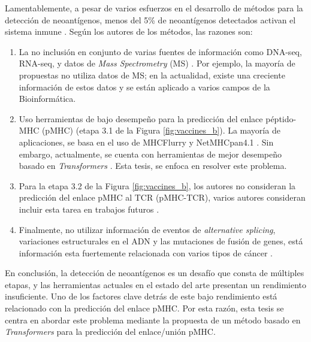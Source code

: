 Lamentablemente, a pesar de varios esfuerzos en el desarrollo  de métodos para la detección de neoantígenos, menos del 5\% de neoantígenos detectados activan el sistema inmune \citep{de2020neoantigen, mill2022neoms, bulik2019deep, bassani2015mass, yadav2014predicting}. Según los autores de los métodos,  las razones son: 

\begin{enumerate}
	\item La no inclusión en conjunto de varias fuentes de información como DNA-seq, RNA-seq, y datos de \textit{Mass Spectrometry} (MS) \citep{kim2018neopepsee}. Por ejemplo, la mayoría de  propuestas no utiliza datos de MS; en la actualidad, existe una creciente información de estos datos y se están aplicado a varios campos de la Bioinformática.
	\item  Uso herramientas de bajo desempeño para la predicción del enlace péptido-MHC (pMHC) (etapa 3.1  de la Figura \ref{fig:vaccines_b}). La mayoría de aplicaciones, se basa en el uso de MHCFlurry \citep{o2020mhcflurry} y NetMHCpan4.1 \citep{reynisson2020netmhcpan}. Sin embargo, actualmente, se cuenta con herramientas de mejor desempeño basado en \textit{Transformers} \citep{arceda2023neoantigen}. Esta tesis, se enfoca en resolver este problema.
	\item Para la etapa 3.2 de la Figura \ref{fig:vaccines_b}, los autores no consideran  la predicción del enlace pMHC al TCR (pMHC-TCR), varios autores consideran incluir esta tarea en trabajos futuros  \citep{rubinsteyn2018computational}.
	\item Finalmente, no utilizar información de eventos de \textit{alternative splicing}, variaciones estructurales en el ADN y las mutaciones de fusión de genes, está información esta fuertemente relacionada con varios tipos de cáncer \citep{wood2020neoepiscope}.
\end{enumerate}

En conclusión, la detección de neoantígenos es un desafío que consta de múltiples etapas, y las herramientas actuales en el estado del arte presentan un rendimiento insuficiente. Uno de los factores clave detrás de este bajo rendimiento está relacionado con la predicción del enlace pMHC. Por esta razón, esta tesis se centra en abordar este problema mediante la propuesta de un método basado en \textit{Transformers} para la predicción del enlace/unión pMHC.


